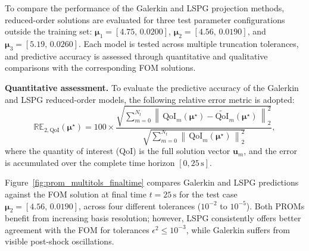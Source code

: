 To compare the performance of the Galerkin and LSPG projection methods, reduced-order solutions are evaluated for three test parameter configurations outside the training set: $\boldsymbol{\mu}_1 = [4.75,\, 0.0200]$, $\boldsymbol{\mu}_2 = [4.56,\, 0.0190]$, and $\boldsymbol{\mu}_3 = [5.19,\, 0.0260]$. Each model is tested across multiple truncation tolerances, and predictive accuracy is assessed through quantitative and qualitative comparisons with the corresponding FOM solutions.

\textbf{Quantitative assessment.}
To evaluate the predictive accuracy of the Galerkin and LSPG reduced-order models, the following relative error metric is adopted:
\begin{equation}
	\label{eq:error-metric}
	\mathbb{RE}_{2, \text{QoI}}(\boldsymbol{\mu}^\star) = 100\times \frac{\sqrt{\displaystyle \sum_{m=0}^{N_t} \left\|\,\text{QoI}_m(\boldsymbol{\mu^\star}) - \widetilde{\text{QoI}}_m (\boldsymbol{\mu^\star})\, \right \|_2^2}} {\sqrt{\sum\limits_{m=0}^{N_t} \left \|\,\text{QoI}_m (\boldsymbol{\mu^\star})\,\right\|_2^2}},
\end{equation}
where the quantity of interest (QoI) is the full solution vector $\mathbf{u}_m$, and the error is accumulated over the complete time horizon $[0, 25\,\text{s}]$.

Figure~\ref{fig:prom_multitols_finaltime} compares Galerkin and LSPG predictions against the FOM solution at final time $t = 25\,\text{s}$ for the test case $\boldsymbol{\mu}_2 = [4.56,\, 0.0190]$, across four different tolerances ($10^{-2}$ to $10^{-5}$). Both PROMs benefit from increasing basis resolution; however, LSPG consistently offers better agreement with the FOM for tolerances $\epsilon^2 \leq 10^{-3}$, while Galerkin suffers from visible post-shock oscillations.


